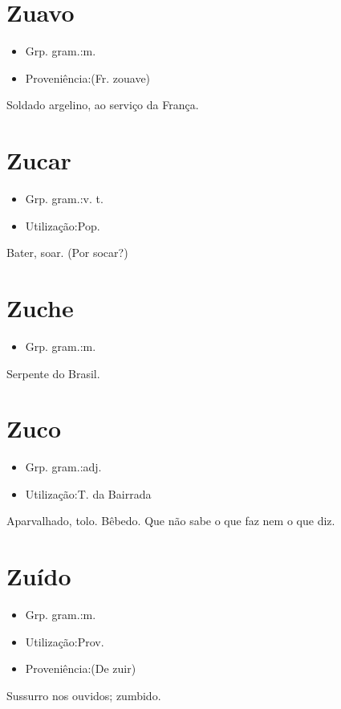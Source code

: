 \section{Zuavo}
\begin{itemize}
\item {Grp. gram.:m.}
\end{itemize}
\begin{itemize}
\item {Proveniência:(Fr. \textunderscore zouave\textunderscore )}
\end{itemize}
Soldado argelino, ao serviço da França.
\section{Zucar}
\begin{itemize}
\item {Grp. gram.:v. t.}
\end{itemize}
\begin{itemize}
\item {Utilização:Pop.}
\end{itemize}
Bater, soar.
(Por \textunderscore socar\textunderscore ?)
\section{Zuche}
\begin{itemize}
\item {Grp. gram.:m.}
\end{itemize}
Serpente do Brasil.
\section{Zuco}
\begin{itemize}
\item {Grp. gram.:adj.}
\end{itemize}
\begin{itemize}
\item {Utilização:T. da Bairrada}
\end{itemize}
Aparvalhado, tolo.
Bêbedo.
Que não sabe o que faz nem o que diz.
\section{Zuído}
\begin{itemize}
\item {Grp. gram.:m.}
\end{itemize}
\begin{itemize}
\item {Utilização:Prov.}
\end{itemize}
\begin{itemize}
\item {Proveniência:(De \textunderscore zuir\textunderscore )}
\end{itemize}
Sussurro nos ouvidos; zumbido.
